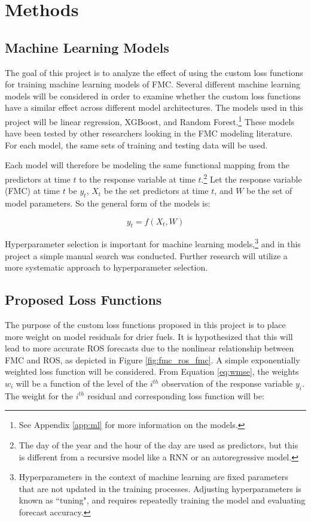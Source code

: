 \documentclass[11pt]{article}%
\begin{document}
\section{Methods}

\subsection{Machine Learning Models}

The goal of this project is to analyze the effect of using the custom loss functions for training machine learning models of FMC. Several different machine learning models will be considered in order to examine whether the custom loss functions have a similar effect across different model architectures. The models used in this project will be linear regression, XGBoost, and Random Forest.\footnote{See Appendix \ref{app:ml} for more information on the models.} These models have been tested by other researchers looking in the FMC modeling literature. \cite{Lee-2020-EFM,McCandless-2020-EWS, Schreck-2023-MLV} For each model, the same sets of training and testing data will be used. 

Each model will therefore be modeling the same functional mapping from the predictors at time $t$ to the response variable at time $t$.\footnote{The day of the year and the hour of the day are used as predictors, but this is different from a recursive model like a RNN or an autoregressive model.} Let the response variable (FMC) at time $t$ be $y_t$, $X_t$ be the set predictors at time $t$, and $W$ be the set of model parameters. So the general form of the models is:

\[
y_t = f(X_t, W)
\]

Hyperparameter selection is important for machine learning models,\footnote{Hyperparameters in the context of machine learning are fixed parameters that are not updated in the training processes. Adjusting hyperparameters is known as ``tuning", and requires repeatedly training the model and evaluating forecast accuracy.} and in this project a simple manual search was conducted. Further research will utilize a more systematic approach to hyperparameter selection. 

\subsection{Proposed Loss Functions}

The purpose of the custom loss functions proposed in this project is to place more weight on model residuals for drier fuels. It is hypothesized that this will lead to more accurate ROS forecasts due to the nonlinear relationship between FMC and ROS, as depicted in Figure \ref{fig:fmc_ros_fmc}. A simple exponentially weighted loss function will be considered. From Equation \ref{eq:wmse}, the weights $w_i$ will be a function of the level of the $i^{th}$ observation of the response variable $y_i$. The weight for the $i^{th}$ residual and corresponding loss function will be:
\end{document}
